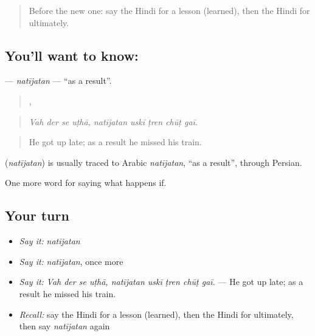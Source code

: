 \label{lesson:HI-C554-natijatan}



\begin{quote}
Before the new one: say the Hindi for a lesson (learned), then the Hindi for ultimately.
\end{quote}

\subsection*{You'll want to know: }
\textbf{} — \emph{natījatan} — \textquotedblleft{}as a result\textquotedblright{}.

\begin{quote}
   ,     
\end{quote}

\begin{quote}
\emph{Vah der se uṭhā, natījatan uskī ṭren chūṭ gaī.}
\end{quote}

\begin{quote}
He got up late; as a result he missed his train.
\end{quote}

\begin{cousinweb}
\textbf{} (\emph{natījatan}) is usually traced to Arabic \emph{natījatan}, \textquotedblleft{}as a result\textquotedblright{}, through Persian.
\end{cousinweb}

\begin{grammarlens}[title={What you've built}]
One more word for saying what happens if.
\end{grammarlens}

\subsection*{Your turn}
\begin{itemize}
\raggedright
  \item \emph{Say it:} \emph{natījatan}
  \item \emph{Say it:} \emph{natījatan}, once more
  \item \emph{Say it:} \emph{Vah der se uṭhā, natījatan uskī ṭren chūṭ gaī.} — He got up late; as a result he missed his train.
  \item \emph{Recall:} say the Hindi for a lesson (learned), then the Hindi for ultimately, then say \emph{natījatan} again
\end{itemize}

